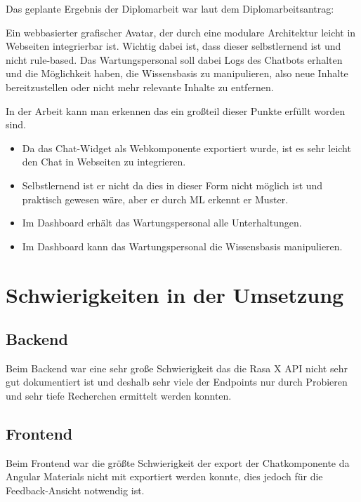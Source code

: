 Das geplante Ergebnis der Diplomarbeit war laut dem Diplomarbeitsantrag:

Ein webbasierter grafischer Avatar, der durch eine modulare Architektur leicht in Webseiten integrierbar ist.
Wichtig dabei ist, dass dieser selbstlernend ist und nicht rule-based.
Das Wartungspersonal soll dabei Logs des Chatbots erhalten und die Möglichkeit haben, die Wissensbasis zu manipulieren, also neue Inhalte bereitzustellen oder nicht mehr relevante Inhalte zu entfernen.

In der Arbeit kann man erkennen das ein großteil dieser Punkte erfüllt worden sind.

\begin{itemize}
    \item Da das Chat-Widget als Webkomponente exportiert wurde, ist es sehr leicht den Chat in Webseiten zu integrieren.
    \item Selbstlernend ist er nicht da dies in dieser Form nicht möglich ist und praktisch gewesen wäre, aber er durch ML erkennt er Muster.
    \item Im Dashboard erhält das Wartungspersonal alle Unterhaltungen.
    \item Im Dashboard kann das Wartungspersonal die Wissensbasis manipulieren.
\end{itemize}

\section{Schwierigkeiten in der Umsetzung}

\subsection{Backend}
Beim Backend war eine sehr große Schwierigkeit das die Rasa X API nicht sehr gut dokumentiert ist und deshalb sehr viele der Endpoints nur durch Probieren und sehr tiefe Recherchen ermittelt werden konnten.


\subsection{Frontend}
Beim Frontend war die größte Schwierigkeit der export der Chatkomponente da Angular Materials nicht mit exportiert werden konnte, dies jedoch für die Feedback-Ansicht notwendig ist.

